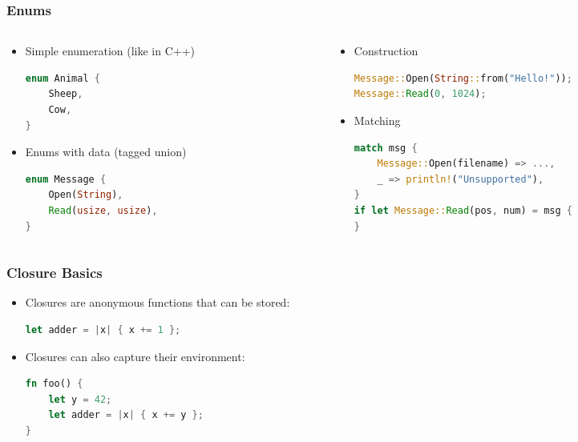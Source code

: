 \begin{frame}[fragile]
    \frametitle{Enums}

    \begin{columns}
    \begin{column}{0.5\textwidth}

    \begin{itemize}
        \item<1-> Simple enumeration (like in C++)
        \begin{lstlisting}[language=rust]
enum Animal {
    Sheep,
    Cow,
}
        \end{lstlisting}

        \item<2-> Enums with data (tagged union)
        \begin{lstlisting}[language=rust]
enum Message {
    Open(String),
    Read(usize, usize),
}
        \end{lstlisting}
    \end{itemize}

    \end{column}
    \begin{column}{0.5\textwidth}

    \begin{itemize}
        \item<3-> Construction
        \begin{lstlisting}[language=rust]
Message::Open(String::from("Hello!"));
Message::Read(0, 1024);
        \end{lstlisting}

        \item<4-> Matching
        \begin{lstlisting}[language=rust]
match msg {
    Message::Open(filename) => ...,
    _ => println!("Unsupported"),
}
if let Message::Read(pos, num) = msg {
}
        \end{lstlisting}
    \end{itemize}

    \end{column}
    \end{columns}
\end{frame}

\begin{frame}[fragile]
    \frametitle{Closure Basics}

    \begin{itemize}
        \item<1-> Closures are anonymous functions that can be stored:
        \begin{lstlisting}[language=rust]
let adder = |x| { x += 1 };
        \end{lstlisting}

        \item<2-> Closures can also capture their environment:
        \begin{lstlisting}[language=rust]
fn foo() {
    let y = 42;
    let adder = |x| { x += y };
}
        \end{lstlisting}
    \end{itemize}
\end{frame}

